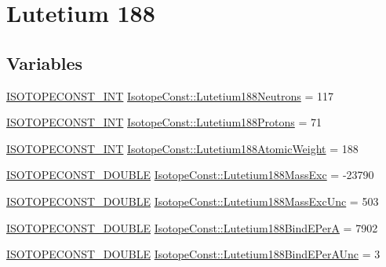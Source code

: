\hypertarget{group___isotope_const-_lutetium-_lu188}{}\section{Lutetium 188}
\label{group___isotope_const-_lutetium-_lu188}
\subsection*{Variables}
\begin{DoxyCompactItemize}
\item 
\mbox{\hyperlink{group___isotope_const-_macros_ga5f18360b3e99483a35c32d789e62621c}{I\+S\+O\+T\+O\+P\+E\+C\+O\+N\+S\+T\+\_\+\+I\+NT}} \mbox{\hyperlink{group___isotope_const-_lutetium-_lu188_gad990f8e37555808973894555413572a2}{Isotope\+Const\+::\+Lutetium188\+Neutrons}} = 117
\item 
\mbox{\hyperlink{group___isotope_const-_macros_ga5f18360b3e99483a35c32d789e62621c}{I\+S\+O\+T\+O\+P\+E\+C\+O\+N\+S\+T\+\_\+\+I\+NT}} \mbox{\hyperlink{group___isotope_const-_lutetium-_lu188_ga3f1034ee98df70565f68b20574898092}{Isotope\+Const\+::\+Lutetium188\+Protons}} = 71
\item 
\mbox{\hyperlink{group___isotope_const-_macros_ga5f18360b3e99483a35c32d789e62621c}{I\+S\+O\+T\+O\+P\+E\+C\+O\+N\+S\+T\+\_\+\+I\+NT}} \mbox{\hyperlink{group___isotope_const-_lutetium-_lu188_ga161a963f5f7dd7cbfc8707144be4d8c8}{Isotope\+Const\+::\+Lutetium188\+Atomic\+Weight}} = 188
\item 
\mbox{\hyperlink{group___isotope_const-_macros_ga8f45a7272ce02c0b4c65c44636ed719a}{I\+S\+O\+T\+O\+P\+E\+C\+O\+N\+S\+T\+\_\+\+D\+O\+U\+B\+LE}} \mbox{\hyperlink{group___isotope_const-_lutetium-_lu188_gaee071789ec16f038d02b1e80d3c6aef9}{Isotope\+Const\+::\+Lutetium188\+Mass\+Exc}} = -\/23790
\item 
\mbox{\hyperlink{group___isotope_const-_macros_ga8f45a7272ce02c0b4c65c44636ed719a}{I\+S\+O\+T\+O\+P\+E\+C\+O\+N\+S\+T\+\_\+\+D\+O\+U\+B\+LE}} \mbox{\hyperlink{group___isotope_const-_lutetium-_lu188_ga4e46e8ae340a8f03c54ed760870dba3d}{Isotope\+Const\+::\+Lutetium188\+Mass\+Exc\+Unc}} = 503
\item 
\mbox{\hyperlink{group___isotope_const-_macros_ga8f45a7272ce02c0b4c65c44636ed719a}{I\+S\+O\+T\+O\+P\+E\+C\+O\+N\+S\+T\+\_\+\+D\+O\+U\+B\+LE}} \mbox{\hyperlink{group___isotope_const-_lutetium-_lu188_ga67b99bdd00e783956f625c1250739a5e}{Isotope\+Const\+::\+Lutetium188\+Bind\+E\+PerA}} = 7902
\item 
\mbox{\hyperlink{group___isotope_const-_macros_ga8f45a7272ce02c0b4c65c44636ed719a}{I\+S\+O\+T\+O\+P\+E\+C\+O\+N\+S\+T\+\_\+\+D\+O\+U\+B\+LE}} \mbox{\hyperlink{group___isotope_const-_lutetium-_lu188_ga04f88137c8fcff6f53e3dde758d5ff02}{Isotope\+Const\+::\+Lutetium188\+Bind\+E\+Per\+A\+Unc}} = 3

\end{DoxyCompactItemize}
